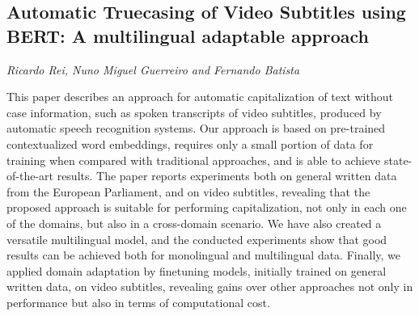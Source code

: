 \documentclass[../booklet.tex]{subfiles}
\begin{document}
\subsection[Automatic Truecasing of Video Subtitles using BERT: A multilingual adaptable approach. {\it Ricardo Rei, Nuno Miguel Guerreiro and Fernando Batista}]{Automatic Truecasing of Video Subtitles using BERT: A multilingual adaptable approach}
  

\begin{center}
  {\it Ricardo Rei, Nuno Miguel Guerreiro and Fernando Batista}
\end{center}

\vskip 0.8cm

 
This paper describes an approach for automatic capitalization of text without case information, such as spoken transcripts of video subtitles, produced by automatic speech recognition systems. Our approach is based on pre-trained contextualized word embeddings, requires only a small portion of data for training when compared with traditional approaches, and is able to achieve state-of-the-art results. The paper reports experiments both on general written data from the European Parliament, and on video subtitles, revealing that the proposed approach is suitable for performing capitalization, not only in each one of the domains, but also in a cross-domain scenario. We have also created a versatile multilingual model, and the conducted experiments show that good results can be achieved both for monolingual and multilingual data. Finally, we applied domain adaptation by finetuning models, initially trained on general written data, on video subtitles, revealing gains over other approaches not only in performance but also in terms of computational cost.

\end{document}
